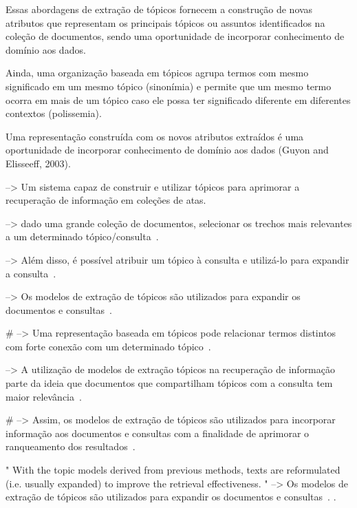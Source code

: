 





Essas abordagens de extração de tópicos fornecem a construção de novas atributos que representam os principais tópicos ou assuntos identificados na coleção de documentos, sendo uma oportunidade de incorporar conhecimento de domínio aos dados. 

Ainda, uma organização baseada em tópicos agrupa termos com mesmo significado em um mesmo tópico (sinonímia) e permite que um mesmo termo ocorra em mais de um tópico caso ele possa ter significado diferente em diferentes contextos (polissemia). 


Uma representação construída com os novos atributos extraídos é uma oportunidade de incorporar conhecimento de domínio aos dados (Guyon and Elisseeff, 2003).




--> { Um sistema capaz de construir e utilizar tópicos para aprimorar a recuperação de informação em coleções de atas. }

--> { dado uma grande coleção de documentos, selecionar os trechos mais relevantes a um determinado tópico/consulta~\cite{Zhai2017}. }

--> Além disso, é possível atribuir um tópico à consulta e utilizá-lo para expandir a consulta~\cite{Xing2009}. 

--> Os modelos de extração de tópicos são utilizados para expandir os documentos e consultas~\cite{WEI2007}.

# --> Uma representação baseada em tópicos pode relacionar termos distintos com forte conexão com um determinado tópico~\cite{Wei2006}.

--> A utilização de modelos de extração tópicos na recuperação de informação parte da ideia que documentos que compartilham tópicos com a consulta tem maior relevância~\cite{Xing2009}. 

# --> Assim, os modelos de extração de tópicos são utilizados para incorporar informação aos documentos e consultas com a finalidade de aprimorar o ranqueamento dos resultados~\cite{WEI2007}.


" With the topic models derived from previous methods, texts are reformulated (i.e. usually expanded) to improve the retrieval effectiveness. "  
--> Os modelos de extração de tópicos são utilizados para expandir os documentos e consultas~\cite{WEI2007}.
.



